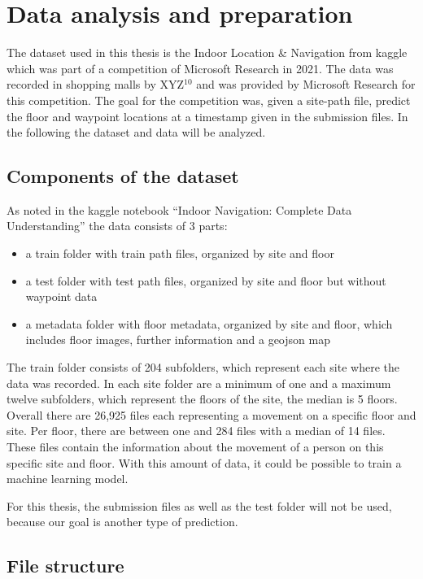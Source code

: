 \chapter{Data analysis and preparation}\label{sec:data-ana}

The dataset used in this thesis is the Indoor Location \& Navigation from kaggle\cite{kaggle} which was part of a competition of Microsoft Research in 2021\cite{IndoorLocationNavigation}.
The data was recorded in shopping malls by XYZ\(^{10}\) and was provided by Microsoft Research for this competition.
The goal for the competition was, given a site-path file, predict the floor and waypoint locations at a timestamp given in the submission files.
In the following the dataset and data will be analyzed.


\section{Components of the dataset}\label{sec:data}
As noted in the kaggle notebook ``Indoor Navigation: Complete Data Understanding'' \cite{IndoorNavigationUnderstanding} the data consists of 3 parts:
% 
\begin{itemize}
    \item a train folder with train path files, organized by site and floor
    \item a test folder with test path files, organized by site and floor but without waypoint data
    \item a metadata folder with floor metadata, organized by site and floor, which includes floor images, further information and a geojson map
\end{itemize}

The train folder consists of 204 subfolders, which represent each site where the data was recorded.
In each site folder are a minimum of one and a maximum twelve subfolders, which represent the floors of the site, the median is 5 floors.
Overall there are 26,925 files each representing a movement on a specific floor and site.
Per floor, there are between one and 284 files with a median of 14 files.
These files contain the information about the movement of a person on this specific site and floor.
With this amount of data, it could be possible to train a machine learning model.

For this thesis, the submission files as well as the test folder will not be used, because our goal is another type of prediction.


\section{File structure}\label{sec:file-structure}

